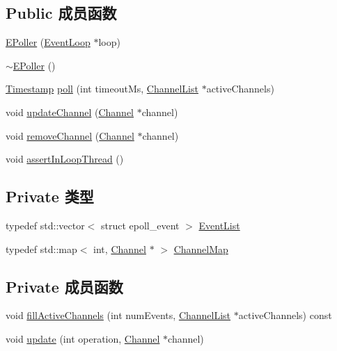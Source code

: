 \subsection*{Public 成员函数}
\begin{DoxyCompactItemize}
\item 
\hyperlink{classmuduo_1_1EPoller_ac03e04dfa659758294b0478a70b1df17}{E\+Poller} (\hyperlink{classmuduo_1_1EventLoop}{Event\+Loop} $\ast$loop)
\item 
\hyperlink{classmuduo_1_1EPoller_aca4e8d4bd83557de60a7bf8523299deb}{$\sim$\+E\+Poller} ()
\item 
\hyperlink{classmuduo_1_1Timestamp}{Timestamp} \hyperlink{classmuduo_1_1EPoller_a0165aabf2721e39f87ad67b05ece9267}{poll} (int timeout\+Ms, \hyperlink{classmuduo_1_1EPoller_a0b74248ffee6df294563618187b52404}{Channel\+List} $\ast$active\+Channels)
\item 
void \hyperlink{classmuduo_1_1EPoller_acaa4a191936aacf608d279a6f343d533}{update\+Channel} (\hyperlink{classmuduo_1_1Channel}{Channel} $\ast$channel)
\item 
void \hyperlink{classmuduo_1_1EPoller_ab10f76c92cb5269f8296e5b3e4dd0ef9}{remove\+Channel} (\hyperlink{classmuduo_1_1Channel}{Channel} $\ast$channel)
\item 
void \hyperlink{classmuduo_1_1EPoller_a9e9c23193ece3ba25a1a2779fc7ebc2d}{assert\+In\+Loop\+Thread} ()
\end{DoxyCompactItemize}
\subsection*{Private 类型}
\begin{DoxyCompactItemize}
\item 
typedef std\+::vector$<$ struct epoll\+\_\+event $>$ \hyperlink{classmuduo_1_1EPoller_ac074005c5f2127640fb6a6e22aa58bae}{Event\+List}
\item 
typedef std\+::map$<$ int, \hyperlink{classmuduo_1_1Channel}{Channel} $\ast$ $>$ \hyperlink{classmuduo_1_1EPoller_a950db725d18ce33d8457ae784380a07e}{Channel\+Map}
\end{DoxyCompactItemize}
\subsection*{Private 成员函数}
\begin{DoxyCompactItemize}
\item 
void \hyperlink{classmuduo_1_1EPoller_a93b3d6d6cac94e92c2ddfd91e9b18cc0}{fill\+Active\+Channels} (int num\+Events, \hyperlink{classmuduo_1_1EPoller_a0b74248ffee6df294563618187b52404}{Channel\+List} $\ast$active\+Channels) const
\item 
void \hyperlink{classmuduo_1_1EPoller_af32077955d1a8c910bde719cb636efd8}{update} (int operation, \hyperlink{classmuduo_1_1Channel}{Channel} $\ast$channel)
\end{DoxyCompactItemize}
